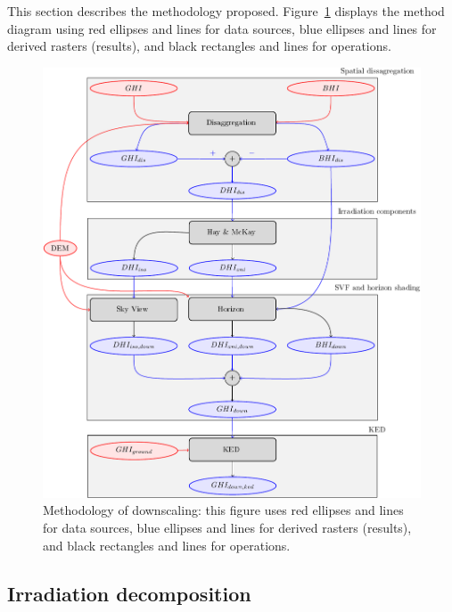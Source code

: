\documentclass[11pt, english]{article}
\begin{document}
This section describes the methodology proposed. Figure~\ref{fig:method} displays the method diagram using red ellipses and lines for data sources, blue ellipses and lines for derived rasters (results), and black rectangles and lines for operations.

\begin{figure}
\centering
\includegraphics[width=\textwidth]{algorithmScheme.pdf}
\caption{Methodology of downscaling: this figure uses red ellipses
and lines for data sources, blue ellipses and lines for derived
rasters (results), and black rectangles and lines for operations.
}
\label{fig:method}
\end{figure}

\subsection{Irradiation decomposition}
\label{sec:irradDecomp}
\end{document}
